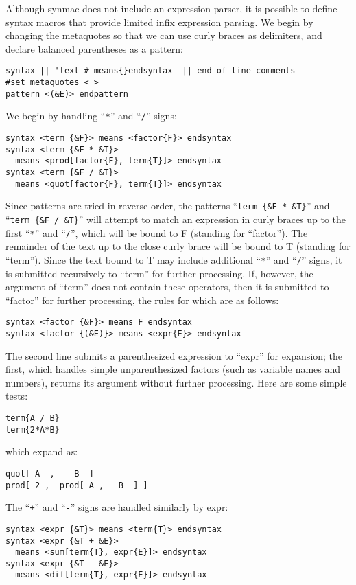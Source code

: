 \documentclass[12pt]{article}
\begin{document}
Although synmac does not include an expression parser, it is possible to define syntax macros that provide limited infix expression parsing.
We begin by changing the metaquotes so that we can use curly braces as delimiters, and declare balanced parentheses as a pattern:
\begin{lstlisting}[frame=single]
syntax || 'text # means{}endsyntax  || end-of-line comments
#set metaquotes < >
pattern <(&E)> endpattern
\end{lstlisting}
We begin by handling ``\lstinline"*"'' and ``\lstinline"/"'' signs:
\begin{lstlisting}[frame=single]
syntax <term {&F}> means <factor{F}> endsyntax
syntax <term {&F * &T}> 
  means <prod[factor{F}, term{T}]> endsyntax
syntax <term {&F / &T}> 
  means <quot[factor{F}, term{T}]> endsyntax
\end{lstlisting}
Since patterns are tried in reverse order, the patterns 
``\lstinline"term {&F * &T}"'' and\\ ``\lstinline"term {&F / &T}"'' will attempt to match an expression in curly braces up to the first ``\lstinline"*"'' and ``\lstinline"/"'', which will be bound to F (standing for ``factor'').
The remainder of the text up to the close curly brace will be bound to T (standing for ``term'').
Since the text bound to T may include additional ``\lstinline"*"'' and ``\lstinline"/"'' signs, it is submitted recursively to ``term'' for further processing.
If, however, the argument of ``term'' does not contain these operators, then it is submitted to ``factor'' for further processing, the rules for which are as follows:
\begin{lstlisting}[frame=single]
syntax <factor {&F}> means F endsyntax
syntax <factor {(&E)}> means <expr{E}> endsyntax
\end{lstlisting}
The second line submits a parenthesized expression to ``expr'' for expansion; the first, which handles simple unparenthesized factors (such as variable names and numbers), returns its argument without further processing.
Here are some simple tests:
\begin{lstlisting}[frame=single]
term{A / B}
term{2*A*B}
\end{lstlisting}
which expand as:
\begin{lstlisting}[frame=single]
quot[ A  ,    B  ] 
prod[ 2 ,  prod[ A ,   B  ] ] 
\end{lstlisting}
The ``\lstinline"+"'' and ``\lstinline"-"'' signs are handled similarly by expr:
\begin{lstlisting}[frame=single]
syntax <expr {&T}> means <term{T}> endsyntax
syntax <expr {&T + &E}> 
  means <sum[term{T}, expr{E}]> endsyntax
syntax <expr {&T - &E}> 
  means <dif[term{T}, expr{E}]> endsyntax
\end{lstlisting}
\end{document}
